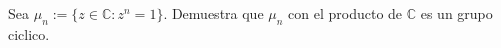 \question
Sea $\mu_n := \{z\in\mathbb{C}: z^n=1\}$. Demuestra que $\mu_n$ con el producto 
de $\mathbb{C}$ es un grupo ciclico.